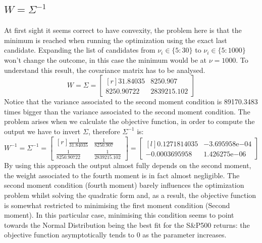 \subsection{$W=\Sigma^{-1}$}\label{SectionCriterionSP500_W}
At first sight it seems correct to have convexity, the problem here is that the minimum is reached when running the optimization using the exact last candidate. Expanding the list of candidates from $\nu_i \in \{5:30\}$ to $\nu_i \in \{5:1000\}$ won't change the outcome, in this case the minimum would be at $\nu=1000$. To understand this result, the covariance matrix has to be analysed.
\begin{equation*}
    W=\Sigma=
    \begin{bmatrix}[r]
        31.84035    &8250.907 \\
        8250.90722  &2839215.102
        \end{bmatrix}
\end{equation*}
Notice that the variance associated to the second moment condition is 89170.3483 times bigger than the variance associated to the second moment condition. The problem arises when we calculate the objective function, in order to compute the output we have to invert $\Sigma$, therefore $\Sigma^{-1}$ is:
\begin{equation*}
    W^{-1}=\Sigma^{-1}=
    \begin{bmatrix}[r]
        \frac{1}{31.84035}    &\frac{1}{8250.907} \\
        \frac{1}{8250.90722}  &\frac{1}{2839215.102}
        \end{bmatrix}=
    \begin{bmatrix}[l]
        0.1271814035    &-3.695958\mathrm{e}{-04} \\
        -0.0003695958    &1.426275\mathrm{e}{-06}
    \end{bmatrix}
\end{equation*}
By using this approach the output almost fully depends on the second moment, the weight associated to the fourth moment is in fact almost negligible. The second moment condition (fourth moment) barely influences the optimization problem whilst solving the quadratic form and, as a result, the objective function is somewhat restricted to minimising the first moment condition (Second moment). In this particular case, minimising this condition seems to point towards the Normal Distribution being the best fit for the S\&P500 returns: the objective function asymptotically tends to 0 as the parameter increases.

